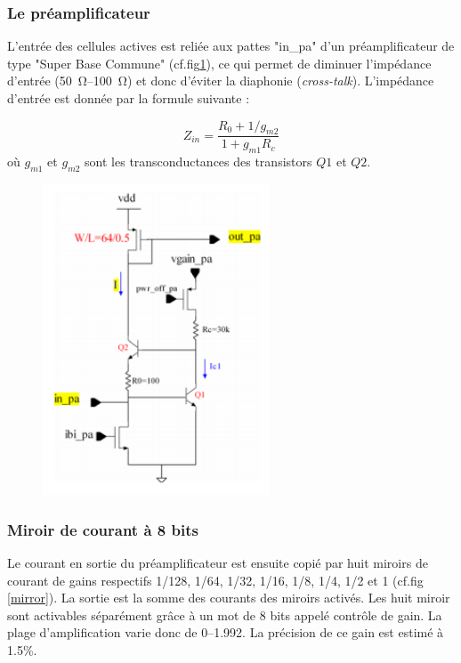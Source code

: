 \subsubsection{Le préamplificateur}
L'entrée des cellules actives est reliée aux pattes "in\_pa" d'un préamplificateur de type "Super Base Commune" (cf.fig\ref{preampli}), ce qui permet de diminuer l'impédance d'entrée (\SIrange{50}{100}{\ohm}) et donc d'éviter la diaphonie (\textit{cross-talk}). L'impédance d'entrée est donnée par la formule suivante :

\begin{equation}
Z_{in}=\frac{R_0+1/g_{m2}}{1+g_{m1}R_c}
\end{equation}
où $g_{m1}$ et $g_{m2}$ sont les transconductances des transistors $Q1$ et $Q2$.

\begin{figure}[th!]
	\centering
	\includegraphics[width=0.60\textwidth]{GLA/preampli.png}
	\label{preampli}
\end{figure}

\subsubsection{Miroir de courant à 8 bits}
Le courant en sortie du préamplificateur est ensuite copié par huit miroirs de courant de gains respectifs 1/128, 1/64, 1/32, 1/16, 1/8, 1/4, 1/2 et 1 (cf.fig \ref{mirror}). La sortie est la somme des courants des miroirs activés. Les huit miroir sont activables séparément grâce à un mot de \num{8} bits appelé contrôle de gain. La plage d'amplification varie donc de \SIrange{0}{1.992}{}. La précision de ce gain est estimé à 1.5\%. 

